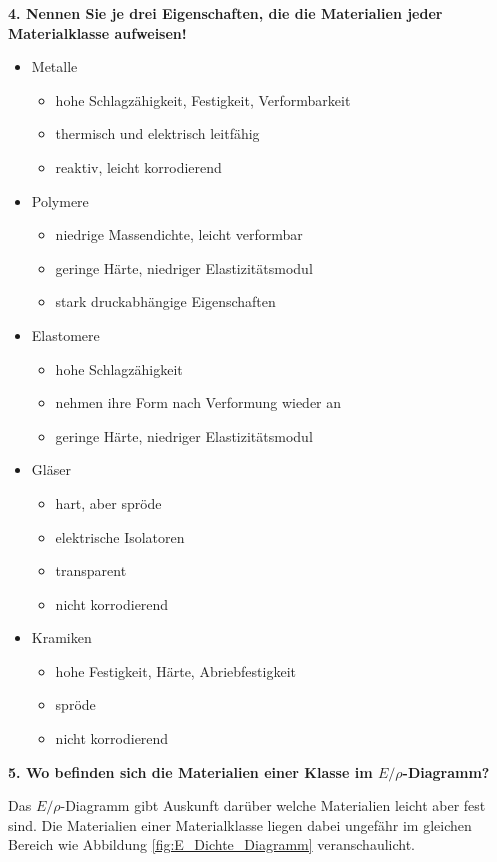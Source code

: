 \noindent\textbf{4. Nennen Sie je drei Eigenschaften, die die Materialien jeder Materialklasse aufweisen!}
\indent \begin{itemize}
    \item Metalle
    \begin{itemize}
        \item hohe Schlagzähigkeit, Festigkeit, Verformbarkeit
        \item thermisch und elektrisch leitfähig
        \item reaktiv, leicht korrodierend
    \end{itemize}
    \item Polymere
    \begin{itemize}
        \item  niedrige Massendichte, leicht verformbar
        \item geringe Härte, niedriger Elastizitätsmodul
        \item stark druckabhängige Eigenschaften
    \end{itemize}
    \item Elastomere
    \begin{itemize}
        \item hohe Schlagzähigkeit
        \item nehmen ihre Form nach Verformung wieder an
        \item geringe Härte, niedriger Elastizitätsmodul
    \end{itemize}
    \item Gläser
    \begin{itemize}
        \item hart, aber spröde
        \item elektrische Isolatoren
        \item transparent
        \item nicht korrodierend
    \end{itemize}
    \item Kramiken
    \begin{itemize}
        \item hohe Festigkeit, Härte, Abriebfestigkeit 
        \item spröde
        \item nicht korrodierend
    \end{itemize}
\end{itemize}
\newpage
\noindent\textbf{5. Wo befinden sich die Materialien einer Klasse im $E/\rho$-Diagramm?}\\
\begin{addmargin}[25pt]{0pt}
Das $E/\rho$-Diagramm gibt Auskunft darüber welche Materialien leicht aber fest sind. Die Materialien einer Materialklasse liegen dabei ungefähr im gleichen Bereich wie Abbildung \ref{fig:E_Dichte_Diagramm} veranschaulicht.
\end{addmargin}
